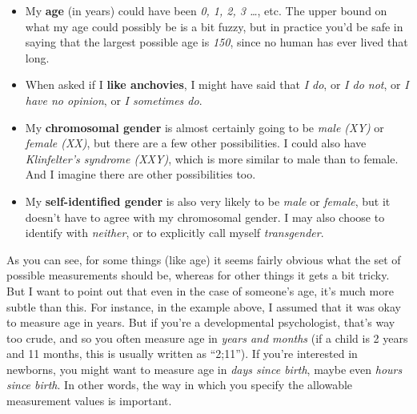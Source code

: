 \begin{itemize}
\item My {\bf age} (in years) could have been {\it 0, 1, 2, 3 \ldots}, etc. The upper bound on what my age could possibly be is a bit fuzzy, but in practice you'd be safe in saying that the largest possible age is {\it 150}, since no human has ever lived that long.
\item When asked if I {\bf like anchovies}, I might have said that {\it I do}, or {\it I do not}, or {\it I have no opinion}, or {\it I sometimes do}. 
\item My {\bf chromosomal gender} is almost certainly going to be {\it male (XY)} or {\it female (XX)}, but there are a few other possibilities. I could also have {\it Klinfelter's syndrome (XXY)}, which is more similar to male than to female. And I imagine there are other possibilities too.
\item My {\bf self-identified gender} is also very likely to be {\it male} or {\it female}, but it doesn't have to agree with my chromosomal gender. I may also choose to identify with {\it neither}, or to explicitly call myself {\it transgender}.
\end{itemize}

As you can see, for some things (like age) it seems fairly obvious what the set of possible measurements should be, whereas for other things it gets a bit tricky. But I want to point out that even in the case of someone's age, it's much more subtle than this. For instance, in the example above, I assumed that it was okay to measure age in years. But if you're a developmental psychologist, that's way too crude, and so you often measure age in {\it years and months} (if a child is 2 years and 11 months, this is usually written as ``2;11''). If you're interested in newborns, you might want to measure age in {\it days since birth}, maybe even {\it hours since birth}. In other words, the way in which you specify the allowable measurement values is important. 

